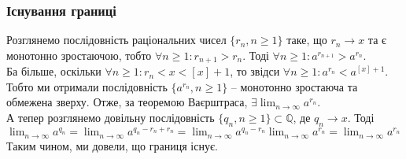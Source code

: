 \documentclass[a4paper, 14pt]{article}
\theoremstyle{theoremdd}
\theoremstyle{theoremdd}
\theoremstyle{theoremdd}
\theoremstyle{theoremdd}
\theoremstyle{theoremdd}
\theoremstyle{theoremdd}
\theoremstyle{theoremdd}
\theoremstyle{theoremdd}
\begin{document}
\subsubsection*{Існування границі}
\iffalse
Розглянемо послідовність раціональних чисел $q_n \to x$. Тоді за критерієм Коші,\\
$\forall \varepsilon > 0: \exists N_1: \forall m,n \geq N: |q_m-q_n| <\varepsilon$.\\
Зокрема якщо $\varepsilon = 1$, то тоді $\exists N_2: \forall m,n \geq N_2: |q_m-q_n| < 1$.\\
Тоді, зафіксувавши $N = \max\{N_1,N_2\}$, отримаємо ось таку оцінку $\forall n \geq N:$\\
$|a^{q_m}-a^{q_n}| = a^{q_m}|a^{q_m-q_n}-1| \leq a^{q_m} 2 |q_m-q_n|(a-1) \boxed{<} 2 a^C \varepsilon (a-1)$.\\
Додаткове пояснення: $q_n$ - збіжна послідовність, а тому - обмежена, тобто $|q_n| < C$. Беремо лише $C \in \mathbb{Q}$. А оскільки $a > 1$, то, $a^{q_n} < a^C$\\
Отже, дійсно, за критерієм Коші, $\exists \displaystyle\lim_{n \to \infty} a^{q_n}$.
\fi
Розглянемо послідовність раціональних чисел $\{r_n, n \geq 1\}$ таке, що $r_n \to x$ та є монотонно зростаючою, тобто $\forall n \geq 1: r_{n+1} > r_n$.
Тоді $\forall n \geq 1: a^{r_{n+1}} > a^{r_n}$.\\
Ба більше, оскільки $\forall n \geq 1: r_n < x < [x]+1$, то звідси $\forall n \geq 1: a^{r_n} < a^{[x]+1}$.\\
Тобто ми отримали послідовність $\{a^{r_n}, n \geq 1\}$ -- монотонно зростаюча та обмежена зверху. Отже, за теоремою Ваєрштраса, $\exists \displaystyle\lim_{n \to \infty} a^{r_n}$.
\bigskip \\
А тепер розглянемо довільну послідовність $\{q_n, n \geq 1\} \subset \mathbb{Q}$, де $q_n \to x$. Тоді \\ $\displaystyle\lim_{n \to \infty} a^{q_n} = \displaystyle\lim_{n \to \infty} a^{q_n-r_n+r_n} = \displaystyle\lim_{n \to \infty} a^{q_n-r_n} \displaystyle\lim_{n \to \infty} a^{r_n} = \lim_{n \to \infty} a^{r_n}$\\
Таким чином, ми довели, що границя існує.
\end{document}
